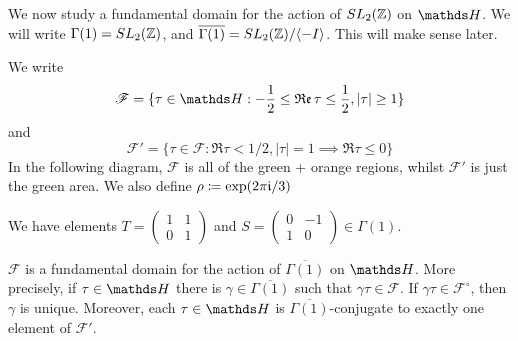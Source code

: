 \documentclass[10pt,a4paper]{article}
\begin{document}
We now study a fundamental domain for the action of $SL_2(\mathbb{Z})$ on $\H$. We will write $\Gamma(1) = SL_2(\mathbb{Z})$, and $\overline{\Gamma(1)} = SL_2(\mathbb{Z})/\langle -I \rangle$. This will make sense later.

We write \[\mathscr{F} = \{\tau \in \H : -\frac12 \leq \Re\tau \leq \frac12, |\tau|\geq 1\}\] and \[\mathscr{F}' = \{\tau \in \mathscr{F} : \Re \tau < 1/2, |\tau| = 1 \implies \Re\tau \leq 0\}\]
In the following diagram, $\mathscr{F}$ is all of the green + orange regions, whilst $\mathscr{F}'$ is just the green area. We also define $\rho\coloneqq \exp(2\pi\mathfrak{i}/3)$
\begin{center}
\end{center}
We have elements $T = \begin{pmatrix} 1&1\\0&1\end{pmatrix}$ and $S =\begin{pmatrix}0&-1\\1&0\end{pmatrix}\in \Gamma(1)$.
\begin{proposition}
  $\mathscr{F}$ is a fundamental domain for the action of $\overline{\Gamma(1)}$ on $\H$. More precisely, if $\tau\in\H$ there is $\gamma \in \overline{\Gamma(1)}$ such that $\gamma\tau \in \mathscr{F}$. If $\gamma \tau \in \mathscr{F}^\circ$, then $\gamma$ is unique. Moreover, each $\tau \in \H$ is $\overline{\Gamma(1)}$-conjugate to exactly one element of $\mathscr{F}'$.
\end{proposition}
\end{document}
